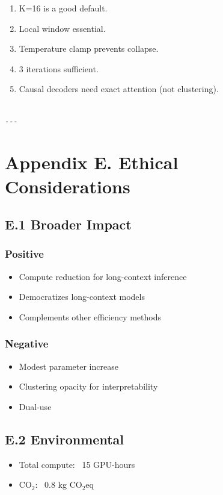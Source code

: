 \begin{enumerate}
\item K=16 is a good default.
\item Local window essential.
\item Temperature clamp prevents collapse.
\item 3 iterations sufficient.
\item Causal decoders need exact attention (not clustering).
\end{enumerate}
\begin{lstlisting}

---
\end{lstlisting}

\section{Appendix E. Ethical Considerations}

\subsection{E.1 Broader Impact}

\subsubsection{Positive}
\begin{itemize}
\item Compute reduction for long-context inference
\item Democratizes long-context models
\item Complements other efficiency methods

\end{itemize}
\subsubsection{Negative}
\begin{itemize}
\item Modest parameter increase
\item Clustering opacity for interpretability
\item Dual-use

\end{itemize}
\subsection{E.2 Environmental}

\begin{itemize}
\item Total compute: ~15 GPU-hours
\item CO$_2$: ~0.8 kg CO$_2$eq

\end{itemize}
